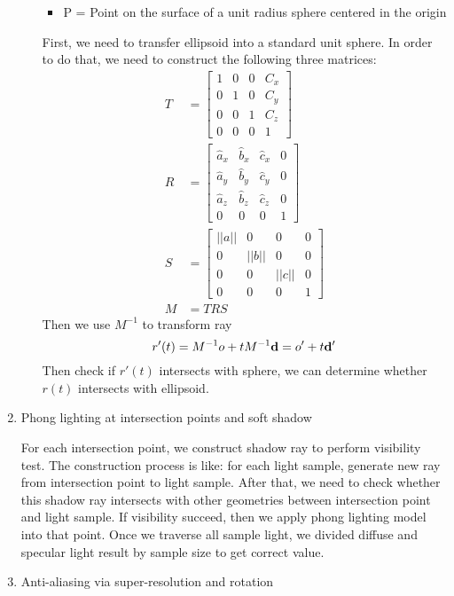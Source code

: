 \documentclass[acmtog]{acmart}
\begin{document}
\begin{enumerate}
\begin{enumerate}
\begin{itemize}
		\item P = Point on the surface of a unit radius sphere centered in the origin
	\end{itemize}
	\par First, we need to transfer ellipsoid into a standard unit sphere. In order to do that, we need to construct the following three matrices:
	\begin{align*}
		T&=
		\begin{bmatrix}
			1 & 0 & 0 & C_x\\
			0 & 1 & 0 & C_y\\
			0 & 0 & 1 & C_z\\
			0 & 0 & 0 & 1
		\end{bmatrix}\\
		R&=
		\begin{bmatrix}
			\hat{a}_x & \hat{b}_x & \hat{c}_x & 0 \\
			\hat{a}_y & \hat{b}_y & \hat{c}_y & 0 \\
			\hat{a}_z & \hat{b}_z & \hat{c}_z & 0 \\
			0 & 0 & 0 & 1
		\end{bmatrix}\\
		S&=
		\begin{bmatrix}
			||a|| & 0 & 0 & 0 \\
			0 & ||b|| & 0 & 0 \\
			0 & 0 & ||c|| & 0 \\
			0 & 0 & 0 & 1
		\end{bmatrix}\\
		M&=TRS
	\end{align*}
	Then we use $M^{-1}$ to transform ray
	\[r'(t)=M^{-1}o+tM^{-1}{\bf d}=o'+t{\bf d'}\]
	Then check if $r'(t)$ intersects with sphere, we can determine whether $r(t)$ intersects with ellipsoid.
	\end{enumerate}
	\item Phong lighting at intersection points and soft shadow
	\par For each intersection point, we construct shadow ray to perform visibility test. The construction process is like: for each light sample, generate new ray from intersection point to light sample. After that, we need to check whether this shadow ray intersects with other geometries between intersection point and light sample. If visibility succeed, then we apply phong lighting model into that point. Once we traverse all sample light, we divided diffuse and specular light result by sample size to get correct value.
	\item Anti-aliasing via super-resolution and rotation\newline

\end{enumerate}
\end{document}
